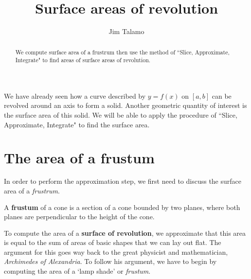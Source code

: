 \documentclass{ximera}
\author{Jim Talamo}
\title[Dig-In:]{Surface areas of revolution}
\begin{document}
\begin{abstract}
We compute surface area of a frustrum then use the method of ``Slice, Approximate, Integrate" to find areas of surface areas of revolution.
\end{abstract}
\maketitle


We have already seen how a curve described by $y=f(x)$ on $[a,b]$ can be revolved around an axis to form a solid. Another geometric quantity of interest is the surface area of this solid.  We will be able to apply the procedure of ``Slice, Approximate, Integrate" to find the surface area. 
\section{The area of a frustum}
 In order to perform the approximation step, we first need to discuss the surface area of a \emph{frustrum}.

\begin{definition}
  A \textbf{frustum} of a cone is a section of a cone bounded by two
  planes, where both planes are perpendicular to the height of the
  cone.


To compute the area of a \textbf{surface of revolution}, we approximate that this area is equal to the sum of areas of basic shapes  that we can lay out flat. The argument for this goes way back to the great physicist and mathematician, \textit{Archimedes of Alexandria}. To follow his argument, we have to begin by computing the area of a `lamp shade' or \textit{frustum}.

  \begin{image}[1in]
  \end{image}
\end{definition}
\end{document}
